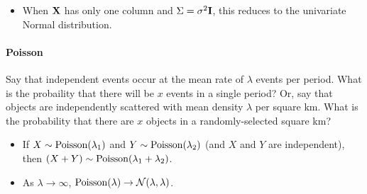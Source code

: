 
\begin{itemize}
\item When ${\bf X}$ has only one column and $\Sigma = \sigma^2{\bf I}$,
this reduces to the univariate Normal distribution.
\end{itemize}

\paragraph{Poisson}

Say that independent events occur at the mean rate of $\lambda$ events per 
period. What is the probaility that there will be $x$ events in a single 
period? Or, say that  objects are independently scattered
with mean density $\lambda$ per square km. What is the probability that
there are $x$ objects in a randomly-selected square km?

\begin{itemize}
\item If $X \sim {\rm Poisson}(\lambda_1)$ and $Y \sim {\rm
Poisson}(\lambda_2)$ (and $X$ and $Y$ are independent), then $(X + Y) \sim {\rm Poisson}(\lambda_1 +
\lambda_2)$.  \item As $\lambda\to\infty$,  ${\rm Poisson}(\lambda)
\to {\cal N}(\lambda, \lambda)$.  \end{itemize}


 
